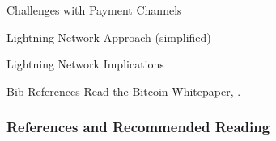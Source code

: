 \documentclass[]{beamer}
\begin{document}
\begin{frame}{Challenges with Payment Channels}


\end{frame}

\begin{frame}{Lightning Network Approach (simplified)}


\end{frame}

\begin{frame}{Lightning Network Implications}


\end{frame}






\begin{frame}{Bib-References}
		Read the Bitcoin Whitepaper, \cite{nakamotoBitcoin2008}.
\end{frame}


\begin{frame}%
\frametitle{References and Recommended Reading}
	
	
\end{frame}
\end{document}
